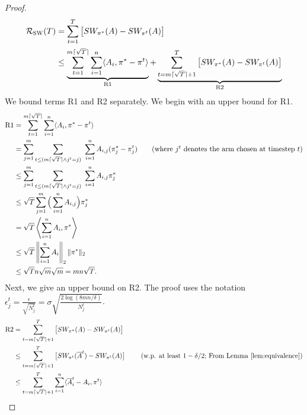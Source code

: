 \rewardRegretUCB*
 \begin{proof}
\begin{align}
    \mathcal{R}_\textsc{SW}(T) &= \sum_{t=1}^T \big[ SW_{\pi^*}(A)  - SW_{\pi^t}(A)  \big] \nonumber \\ 
&\leq  \underbrace{\sum_{t=1}^{ m\lceil \sqrt{T} \rceil} \sum_{i=1}^n \langle A_i, \pi^* - \pi^t \rangle}_{\textup{R1}}   + \underbrace{ \sum_{t= m\lceil \sqrt{T } \rceil + 1 }^T \big[ SW_{\pi^*}(A)  - SW_{\pi^t}(A)  \big] }_{\textup{R2}} 
\end{align}
We bound terms R1 and R2 separately. We begin with an upper bound for R1. 
\begin{align*}
 \textup{R1} &=  \sum_{t=1}^{ m\lceil \sqrt{T} \rceil} \sum_{i=1}^n \langle A_i, \pi^* - \pi^t \rangle 
 \\ &=  \sum_{j =1}^m\sum_{t \leq (m\lceil \sqrt{T} \rceil \land j^t =j) } \  \sum_{i=1}^n   A_{i,j} ( \pi_j^* - \pi^t_j )  \tag{where $j^t$ denotes the arm chosen at timestep $t$}\\
&\leq \sum_{j =1}^m\sum_{t \leq (m\lceil \sqrt{T} \rceil \land j^t =j) }\  \sum_{i=1}^n   A_{i,j}  \pi_j^*    \\ 
&\leq  \sqrt{T}  \sum_{j =1}^m \Big (\sum_{i=1}^n   A_{i,j} \Big )  \pi_j^* 
\\ & = \sqrt{T} \left\langle \sum_{i=1}^n   A_i, \pi^*  \right\rangle   \\ 
&\leq  \sqrt{T}  \left\| \sum_{i=1}^n   A_{i}\right\|_2  \|\pi^*\|_2    \\ 
&\leq \sqrt{T} n\sqrt{m}\sqrt{m}  = mn\sqrt{T}.
\end{align*}
Next, we give an upper bound on R2. The proof uses the notation $\epsilon^t_{j}=\frac{\epsilon}{\sqrt{N_j^t}}=\sigma \sqrt{\frac{2\log{(8mn/\delta)}}{N_j^t}}$. 
\begin{align*}
   \textup{R2} &= \sum_{t= m\lceil \sqrt{T } \rceil + 1 }^T \big[ SW_{\pi^*}(A)  - SW_{\pi^t}(A)  \big] \\ 
   & \leq \sum_{t= m\lceil \sqrt{T } \rceil + 1 }^T \big[ SW_{\pi^t}(\overline{A}^t)  - SW_{\pi^t}(A)  \big] \ \tag{w.p. at least $1-\delta/2$; From Lemma \ref{lem:equivalence}}\\  
  & \leq  \sum_{t= m\lceil \sqrt{T } \rceil +1}^T \sum_{i=1}^n \langle \overline{A}_i^t - A_i,  \pi^t \rangle \\ 

\end{align*}
\end{proof}

